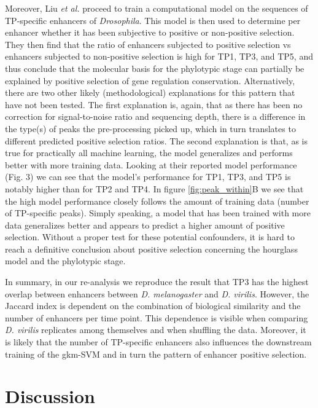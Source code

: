Moreover, Liu \textit{et al.} proceed to train a computational model on the sequences of TP-specific enhancers of \textit{Drosophila}. This model is then used to determine per enhancer whether it has been subjective to positive or non-positive selection. They then find that the ratio of enhancers subjected to positive selection vs enhancers subjected to non-positive selection is high for TP1, TP3, and TP5, and thus conclude that the molecular basis for the phylotypic stage can partially be explained by positive selection of gene regulation conservation. Alternatively, there are two other likely (methodological) explanations for this pattern that have not been tested. The first explanation is, again, that as there has been no correction for signal-to-noise ratio and sequencing depth, there is a difference in the type(s) of peaks the pre-processing picked up, which in turn translates to different predicted positive selection ratios\cite{encode_guidelines2012,Whalen2021}. The second explanation is that, as is true for practically all machine learning, the model generalizes and performs better with more training data. Looking at their reported model performance (Fig. 3\cite{Liu2021}) we can see that the model's performance for TP1, TP3, and TP5 is notably higher than for TP2 and TP4. In figure \ref{fig:peak_within}B we see that the high model performance closely follows the amount of training data (number of TP-specific peaks). Simply speaking, a model that has been trained with more data generalizes better and appears to predict a higher amount of positive selection. Without a proper test for these potential confounders, it is hard to reach a definitive conclusion about positive selection concerning the hourglass model and the phylotypic stage.

In summary, in our re-analysis we reproduce the result that TP3 has the highest overlap between enhancers between \textit{D. melanogaster} and \textit{D. virilis}. However, the Jaccard index is dependent on the combination of biological similarity and the number of enhancers per time point. This dependence is visible when comparing \textit{D. virilis} replicates among themselves and when shuffling the data. Moreover, it is likely that the number of TP-specific enhancers also influences the downstream training of the gkm-SVM and in turn the pattern of enhancer positive selection. 

\section{Discussion}

